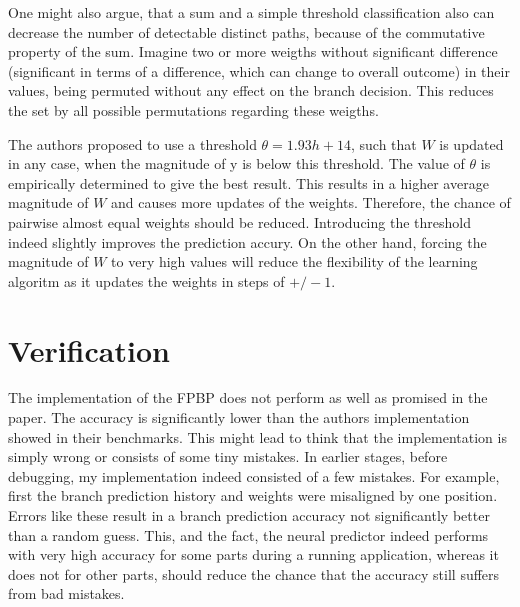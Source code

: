 \documentclass{article}
\begin{document}
One might also argue, that a sum and a simple threshold classification also can decrease the number of detectable distinct paths, because of the commutative property of the sum. Imagine two or more weigths without significant  difference (significant in terms of a difference, which can change to overall outcome) in their values, being permuted without any effect on the branch decision. This reduces the set by all possible permutations regarding these weigths.

The authors proposed to use a threshold $\theta = 1.93 h + 14$, such that $W$ is updated in any case, when the magnitude of y is below this threshold. The value of $\theta$ is empirically determined to give the best result. This results in a higher average magnitude of $W$  and causes more updates of the weights. Therefore, the chance of pairwise almost equal weights should be reduced. Introducing the threshold indeed slightly improves the prediction accury. 
On the other hand, forcing the magnitude of $W$ to very high values will reduce the flexibility of the learning algoritm as it updates the weights in steps of $+/-1$.


\section{Verification}
The implementation of the FPBP does not perform as well as promised in the paper. The accuracy is significantly lower than the authors implementation showed in their benchmarks. This might lead to think that the implementation is simply wrong or consists of some tiny mistakes. 
In earlier stages, before debugging, my implementation indeed consisted of a few mistakes. For example, first the branch prediction history and weights were misaligned by one position. Errors like these result in a branch prediction accuracy not significantly better than a random guess. This, and the fact, the neural predictor indeed performs with very high accuracy for some parts during a running application, whereas it does not for other parts, should reduce the chance that the accuracy still suffers from bad mistakes.


\end{document}
